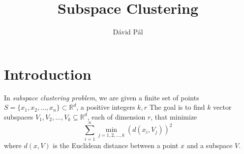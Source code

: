 \documentclass{article}
\newcommand{\R}{\mathbb{R}}
\begin{document}
\title{Subspace Clustering}
\author{D\'avid P\'al}
\maketitle

\section{Introduction}

In \emph{subspace clustering problem}, we are given
a finite set of points $S = \{x_1, x_2, \dots, x_n\} \subset \R^d$,
a positive integers $k,r$
The goal is to find $k$ vector subspaces $V_1, V_2, \dots, V_k \subseteq \R^d$,
each of dimension $r$, that minimize
\begin{equation}
\label{equation:cost-function}
\sum_{i=1}^n \min_{j=1,2,\dots,k} \left( d(x_i, V_j) \right)^2
\end{equation}
where $d(x,V)$ is the Euclidean distance between a point $x$
and a subspace $V$.
\end{document}
